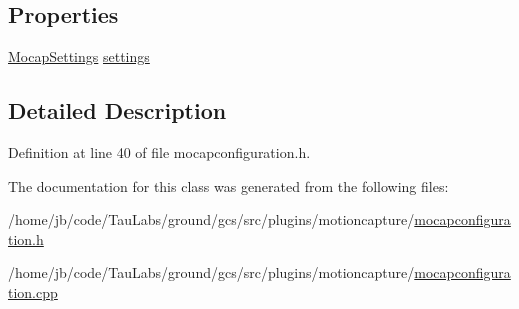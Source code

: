 \subsection*{\-Properties}
\begin{DoxyCompactItemize}
\item 
\hyperlink{group___mo_cap_plugin_ga6083347a5b3eb70e360f599354dc0f0b}{\-Mocap\-Settings} \hyperlink{group___mo_cap_plugin_ga7211120cc5d6c7feffb594a36552a9af}{settings}
\end{DoxyCompactItemize}


\subsection{\-Detailed \-Description}


\-Definition at line 40 of file mocapconfiguration.\-h.



\-The documentation for this class was generated from the following files\-:\begin{DoxyCompactItemize}
\item 
/home/jb/code/\-Tau\-Labs/ground/gcs/src/plugins/motioncapture/\hyperlink{mocapconfiguration_8h}{mocapconfiguration.\-h}\item 
/home/jb/code/\-Tau\-Labs/ground/gcs/src/plugins/motioncapture/\hyperlink{mocapconfiguration_8cpp}{mocapconfiguration.\-cpp}\end{DoxyCompactItemize}

